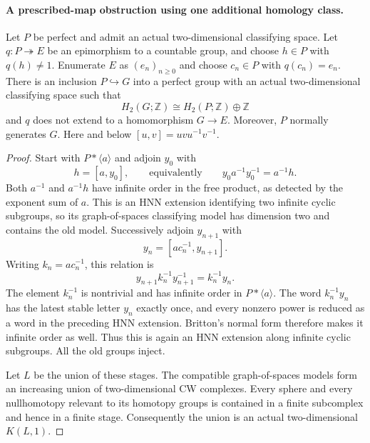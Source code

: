 \paragraph{A prescribed-map obstruction using one additional homology class.}
Let $P$ be perfect and admit an actual two-dimensional classifying space.
Let $q:P\twoheadrightarrow E$ be an epimorphism to a countable group,
and choose $h\in P$ with $q(h)\ne1$. Enumerate $E$ as $(e_n)_{n\ge0}$
and choose $c_n\in P$ with $q(c_n)=e_n$. There is an inclusion
$P\hookrightarrow G$ into a perfect group with an actual two-dimensional
classifying space such that
\[
 H_2(G;\mathbb Z)\cong H_2(P;\mathbb Z)\oplus\mathbb Z
\]
and $q$ does not extend to a homomorphism $G\to E$.
Moreover, $P$ normally generates $G$.
Here and below $[u,v]=uvu^{-1}v^{-1}$.

\begin{proof}
Start with $P*\langle a\rangle$ and adjoin $y_0$ with
\[
 h=[a,y_0],\qquad\text{equivalently}\qquad
 y_0a^{-1}y_0^{-1}=a^{-1}h.
\]
Both $a^{-1}$ and $a^{-1}h$ have infinite order in the free product,
as detected by the exponent sum of $a$. This is an HNN extension
identifying two infinite cyclic subgroups, so its graph-of-spaces
classifying model has dimension two and contains the old model.
Successively adjoin $y_{n+1}$ with
\[
 y_n=[a c_n^{-1},y_{n+1}].
\]
Writing $k_n=a c_n^{-1}$, this relation is
\[
 y_{n+1}k_n^{-1}y_{n+1}^{-1}=k_n^{-1}y_n.
\]
The element $k_n^{-1}$ is nontrivial and has infinite order in
$P*\langle a\rangle$. The word $k_n^{-1}y_n$ has the latest stable
letter $y_n$ exactly once, and every nonzero power is reduced as a
word in the preceding HNN extension. Britton's normal form therefore
makes it infinite order as well. Thus this is again an HNN extension
along infinite cyclic subgroups. All the old groups inject.

Let $L$ be the union of these stages. The compatible graph-of-spaces
models form an increasing union of two-dimensional CW complexes.
Every sphere and every nullhomotopy relevant to its homotopy groups
is contained in a finite subcomplex and hence in a finite stage.
Consequently the union is an actual two-dimensional $K(L,1)$.


\end{proof}
